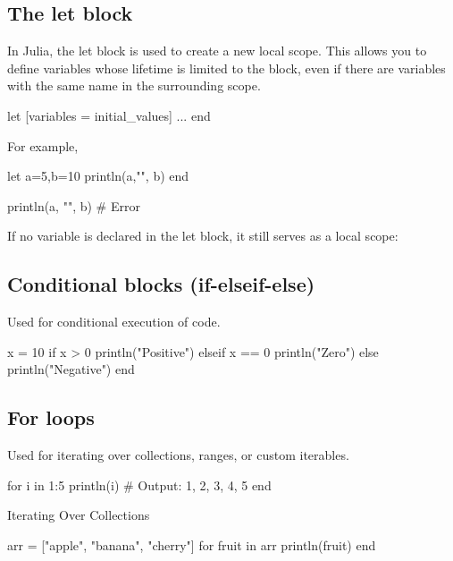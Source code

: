 \documentclass{report}
\begin{document}
    \subsection{The let block}
    \bigbreak \noindent 
    In Julia, the let block is used to create a new local scope. This allows you to define variables whose lifetime is limited to the block, even if there are variables with the same name in the surrounding scope.
    \bigbreak \noindent 
    \begin{jlcode}
        let [variables = initial_values]
            ...
        end
    \end{jlcode}
    \bigbreak \noindent 
    For example, 
    \bigbreak \noindent 
    \begin{jlcode}
        let a=5,b=10
            println(a,"\n", b)
        end

        println(a, "\n", b) # Error
    \end{jlcode}
    \bigbreak \noindent 
    If no variable is declared in the let block, it still serves as a local scope:
    \bigbreak \noindent 

    \bigbreak \noindent 
    \subsection{Conditional blocks (if-elseif-else)}
    \bigbreak \noindent 
    Used for conditional execution of code.
    \bigbreak \noindent 
    \begin{jlcode}
        x = 10
        if x > 0
            println("Positive")
            elseif x == 0
            println("Zero")
        else
            println("Negative")
        end
    \end{jlcode}

    \bigbreak \noindent 
    \subsection{For loops}
    \bigbreak \noindent 
    Used for iterating over collections, ranges, or custom iterables.
    \bigbreak \noindent 
    \begin{jlcode}
        for i in 1:5
            println(i)  # Output: 1, 2, 3, 4, 5
        end
    \end{jlcode}
    \bigbreak \noindent 
    Iterating Over Collections
    \bigbreak \noindent 
    \begin{jlcode}
        arr = ["apple", "banana", "cherry"]
        for fruit in arr
            println(fruit)
        end
    \end{jlcode}
\end{document}
